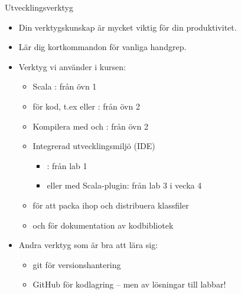 \begin{Slide}{Utvecklingsverktyg}
\begin{itemize}
\item Din verktygskunskap är mycket viktig för din produktivitet. 
\item Lär dig kortkommandon för vanliga handgrep. 
\item Verktyg vi använder i kursen:
\begin{itemize}
\item Scala : från övn 1
\item {} för kod, t.ex  eller : från övn 2
\item Kompilera med  och : från övn 2
\item Integrerad utvecklingsmiljö (IDE)
\begin{itemize}
\item {}: från lab 1
\item {} eller  med Scala-plugin: från lab 3 i vecka 4
\end{itemize}
\item {} för att packa ihop och distribuera klassfiler
\item {} och  för dokumentation av kodbibliotek
\end{itemize}
\item Andra verktyg som är bra att lära sig:
\begin{itemize}
\item git för versionshantering
\item GitHub för kodlagring -- men  av lösningar till labbar!
\end{itemize}
\end{itemize}
\end{Slide}


\ifkompendium\else  %

